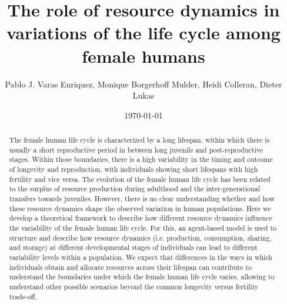 \documentclass{article}
\title{The role of resource dynamics in variations of the life cycle among female humans}
\author{Pablo J. Varas Enriquez, Monique Borgerhoff Mulder, Heidi Colleran, Dieter Lukas}
\date{\today}
\begin{document}
\maketitle

\begin{abstract}
    The female human life cycle is characterized by a long lifespan, within which there is usually a short reproductive period in between long juvenile and post-reproductive stages. Within those boundaries, there is a high variability in the timing and outcome of longevity and reproduction, with individuals showing short lifespans with high fertility and vice versa. The evolution of the female human life cycle has been related to the surplus of resource production during adulthood and the inter-generational transfers towards juveniles. However, there is no clear understanding whether and how these resource dynamics shape the observed variation in human populations. Here we develop a theoretical framework to describe how different resource dynamics influence the variability of the female human life cycle. For this, an agent-based model is used to structure and describe how resource dynamics (i.e. production, consumption, sharing, and storage) at different developmental stages of individuals can lead to different variability levels within a population. We expect that differences in the ways in which individuals obtain and allocate resources across their lifespan can contribute to understand the boundaries under which the female human life cycle varies, allowing to understand other possible scenarios beyond the common longevity versus fertility trade-off.
\end{abstract}
\end{document}
